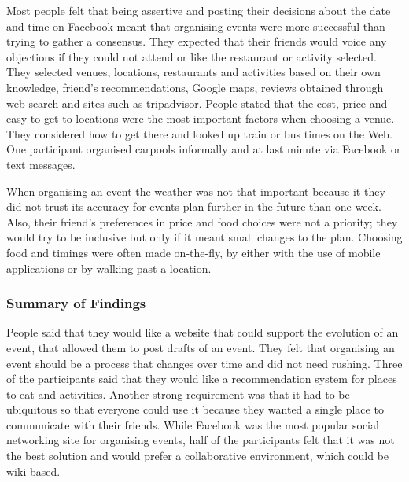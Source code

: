 \documentclass{sigchi}
\begin{document}
Most people felt that being assertive and posting their decisions about the date and time on Facebook meant that organising events were more successful than trying to gather a consensus.  They expected that their friends would voice any objections if they could not attend or like the restaurant or activity selected.   They selected venues, locations, restaurants and activities based on their own knowledge, friend's recommendations, Google maps, reviews obtained through web search and sites such as tripadvisor.  People stated that the cost, price and easy to get to locations were the most important factors when choosing a venue.  They considered how to get there and looked up train or bus times on the Web.  One participant organised carpools informally and at last minute via Facebook or text messages.

When organising an event the weather was not that important because it they did not trust its accuracy for events plan further in the future than one week.  Also, their friend's preferences in price and food choices were not a priority; they would try to be inclusive but only if it meant small changes to the plan.  Choosing food and timings were often made on-the-fly, by either with the use of mobile applications or by walking past a location.

\subsubsection{Summary of Findings}
People said that they would like a website that could support the evolution of an event, that allowed them to post drafts of an event.  They felt that organising an event should be a process that changes over time and did not need rushing.  Three of the participants said that they would like a recommendation system for places to eat and activities. Another strong requirement was that it had to be ubiquitous so that everyone could use it because they wanted a single place to communicate with their friends.  While Facebook was the most popular social networking site for organising events, half of the participants felt that it was not the best solution and would prefer a collaborative environment, which could be wiki based.
\end{document}
